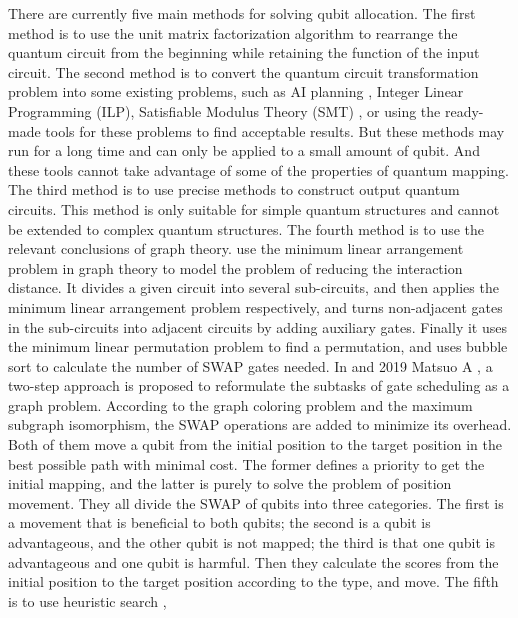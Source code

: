 \documentclass[runningheads]{llncs}
\begin{document}
There are currently five main methods for solving qubit allocation. 
The first method is to use the unit matrix factorization algorithm to rearrange 
the quantum circuit from the beginning while retaining the function of the input 
circuit\cite{2019CNOT,2019Quantum}.
The second method is to convert the quantum circuit transformation problem into 
some existing problems, such as AI planning \cite{2017Temporal,2018Integer}, 
Integer Linear Programming (ILP)\cite{2019Almeida}, 
Satisfiable Modulus Theory (SMT) \cite{2019Murali}, 
or using the ready-made tools for these problems to find acceptable results.
But these methods may run for a long time and 
can only be applied to a small amount of qubit. 
And these tools cannot take advantage of some of the properties of quantum mapping.
The third method is to use precise methods to construct output quantum circuits. 
This method is only suitable for simple quantum structures and cannot be extended to 
complex quantum structures\cite{2018QubitSiraichi}.
The fourth method is to use the relevant conclusions of graph theory.
\cite{Shafaei2013} use the minimum linear arrangement problem in graph theory 
to model the problem of reducing the interaction distance.
It divides a given circuit into several sub-circuits, 
and then applies the minimum linear arrangement problem respectively, 
and turns non-adjacent gates in the sub-circuits into adjacent circuits 
by adding auxiliary gates.
Finally it uses the minimum linear permutation problem to find a permutation, 
and uses bubble sort to calculate the number of SWAP gates needed.
In \cite{Guerreschi2018} and 2019 Matsuo A \cite{Matsuo2019}, 
a two-step approach is proposed to reformulate the subtasks 
of gate scheduling as a graph problem.
According to the graph coloring problem and the maximum subgraph isomorphism,
the SWAP operations are added to minimize its overhead.
Both of them move a qubit from the initial position to 
the target position in the best possible path with minimal cost.
The former defines a priority to get the initial mapping, 
and the latter is purely to solve the problem of position movement. 
They all divide the SWAP of qubits into three categories. 
The first is a movement that is beneficial to both qubits; 
the second is a qubit is advantageous, 
and the other qubit is not mapped; 
the third is that one qubit is advantageous and 
one qubit is harmful. 
Then they calculate the scores from the initial position 
to the target position according to the type, and move.
The fifth is to use heuristic search \cite{Zulehner2017,Cowtan2019,Li2018,Xiangzhen2020,2018QubitSiraichi},
\end{document}
